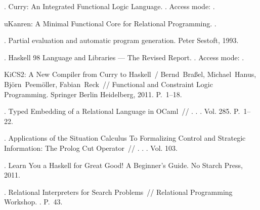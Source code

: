 \begin{thebibliography}{10}
  . Curry: An Integrated Functional Logic Language.
    \BibDash
  . \BibDash
  \newblock Access mode:
    .

   uKanren: A Minimal Functional Core
    for Relational Programming. \BibDash
  .

  . Partial evaluation and
    automatic program generation. \BibDash
  \newblock Peter Sestoft, 1993.

  . Haskell 98 Language and Libraries --- The
    Revised Report. \BibDash
  . \BibDash
  \newblock Access mode: .

  KiCS2: A New Compiler from Curry to Haskell~/ Bernd~Bra{\ss}el, Michael~Hanus,
    Bj{\"o}rn~Peem{\"o}ller, Fabian~Reck~// Functional and Constraint Logic
    Programming. \BibDash
  \newblock Springer Berlin Heidelberg, 2011. \BibDash
  \newblock P.~1--18.

  . Typed Embedding of a Relational
    Language in OCaml~// . \BibDash
  . . \BibDash
  \newblock Vol. 285. \BibDash
  \newblock P.~1--22.

  . Applications of the Situation Calculus To Formalizing
    Control and Strategic Information: The Prolog Cut Operator~//
    . \BibDash
  . . \BibDash
  \newblock Vol. 103.

  . Learn You a Haskell for Great Good! A Beginner’s
    Guide. \BibDash
  \newblock No Starch Press, 2011.

  . Relational
    Interpreters for Search Problems~// Relational Programming Workshop. \BibDash
  . \BibDash
  \newblock P.~43.


\end{thebibliography}
